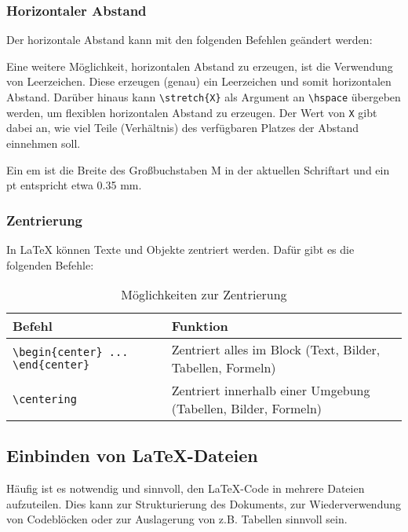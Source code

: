 \subsubsection{Horizontaler Abstand}
Der horizontale Abstand kann mit den folgenden Befehlen geändert werden:



Eine weitere Möglichkeit, horizontalen Abstand zu erzeugen, ist die Verwendung von Leerzeichen. Diese erzeugen (genau) ein Leerzeichen und somit horizontalen Abstand.
Darüber hinaus kann \texttt{\textbackslash stretch\{X\}} als Argument an \texttt{\textbackslash hspace} übergeben werden, um flexiblen horizontalen Abstand zu erzeugen. Der Wert von \texttt{X} gibt dabei an, wie viel Teile (Verhältnis) des verfügbaren Platzes der Abstand einnehmen soll.

Ein em ist die Breite des Großbuchstaben M in der aktuellen Schriftart und ein pt entspricht etwa 0.35 mm.

\subsubsection{Zentrierung}
In \LaTeX{} können Texte und Objekte zentriert werden. Dafür gibt es die folgenden Befehle:
\begin{table}[H]
    \centering
    \begin{tabular}{lp{6cm}c}
        \toprule
        \textbf{Befehl} & \textbf{Funktion}                                              \\
        \midrule
        \texttt{\textbackslash begin\{center\} ... \textbackslash end\{center\}}
                        & Zentriert alles im Block (Text, Bilder, Tabellen, Formeln)     \\

        \texttt{\textbackslash centering}
                        & Zentriert innerhalb einer Umgebung (Tabellen, Bilder, Formeln) \\
        \bottomrule
    \end{tabular}
    \caption{Möglichkeiten zur Zentrierung}
    \label{tab:center_vs_centering}
\end{table}

\subsection{Einbinden von \LaTeX{}-Dateien}
\label{sec:einbinden_von_latex_dateien}
Häufig ist es notwendig und sinnvoll, den \LaTeX{}-Code in mehrere Dateien aufzuteilen. Dies kann zur Strukturierung des Dokuments, zur Wiederverwendung von Codeblöcken oder zur Auslagerung von z.B. Tabellen sinnvoll sein.

